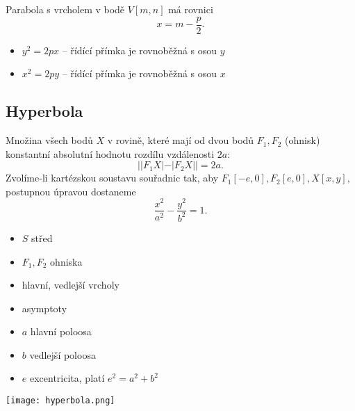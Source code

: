 \begin{pozn}
    Parabola s vrcholem v bodě $V[m,n]$ má rovnici
    $$x=m-\frac{p}{2}.$$
\end{pozn}

\begin{pozn}
\begin{itemize}
\item $y^2=2px$ -- řídící přímka je rovnoběžná s osou $y$
\item $x^2=2py$ -- řídící přímka je rovnoběžná s osou $x$
\end{itemize}
\end{pozn}

\subsection*{Hyperbola}
Množina všech bodů $X$ v rovině, které mají od dvou bodů $F_1, F_2$
(ohnisk) konstantní absolutní hodnotu rozdílu vzdálenosti $2a$:
$$||F_1X|-|F_2X||=2a.$$
Zvolíme-li kartézskou soustavu souřadnic tak, aby $F_1[-e,0], F_2[e,0],
X[x,y],$ postupnou úpravou dostaneme
$$\frac{x^2}{a^2}-\frac{y^2}{b^2}=1.$$

\begin{minipage}{0.48\linewidth}
\begin{itemize}
\item $S$ střed
\item $F_1,F_2$ ohniska
\item hlavní, vedlejší vrcholy
\item asymptoty
\item $a$ hlavní poloosa
\item $b$ vedlejší poloosa
\item $e$ excentricita, platí $e^2=a^2+b^2$
\end{itemize}
\end{minipage}
\hfill
\begin{minipage}{0.48\linewidth}
    \texttt{[image: hyperbola.png]}
\end{minipage}
